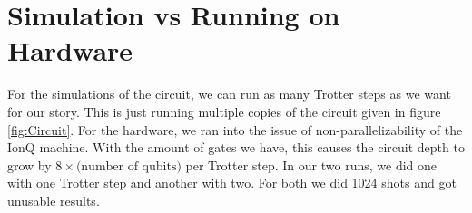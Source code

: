 \documentclass[11pt]{article}
\begin{document}
  \section{Simulation vs Running on Hardware}
    For the simulations of the circuit, we can run as many Trotter steps as we want for our story. This is just running multiple copies of the circuit given in figure \ref{fig:Circuit}. For the hardware, we ran into the issue of non-parallelizability of the IonQ machine. With the amount of gates we have, this causes the circuit depth to grow by $8\times\text{(number of qubits)}$ per Trotter step. In our two runs, we did one with one Trotter step and another with two. For both we did 1024 shots and got unusable results.  
      

  
  
  
\end{document}
